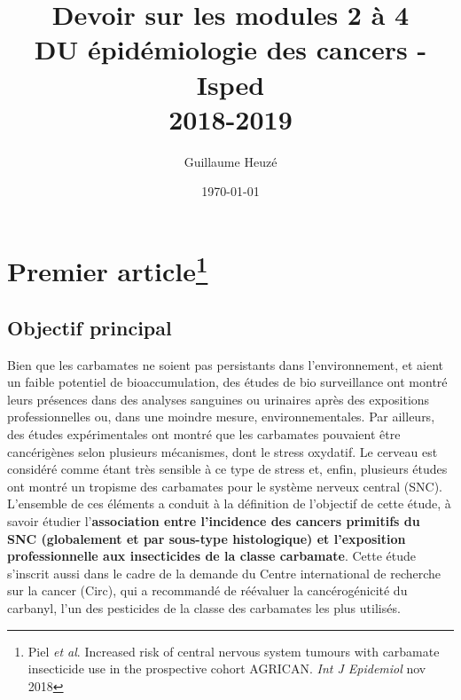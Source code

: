 \documentclass[10pt]{article}
\begin{document}
\title{Devoir sur les modules 2 à 4\\
\small{DU épidémiologie des cancers - Isped\\
2018-2019}}
\author{Guillaume Heuzé}
\date{\today}
\maketitle

\section{Premier article\protect\footnote{Piel \emph{et al}. Increased risk of central nervous system tumours with carbamate insecticide use in the prospective cohort AGRICAN. \emph{Int J Epidemiol} nov 2018}}

\subsection{Objectif principal}
Bien que les carbamates ne soient pas persistants dans l'environnement, et aient un faible potentiel de bioaccumulation, des études de bio surveillance ont montré leurs présences dans des analyses sanguines ou urinaires après des expositions professionnelles ou, dans une moindre mesure, environnementales. Par ailleurs, des études expérimentales ont montré que les carbamates pouvaient être cancérigènes selon plusieurs mécanismes, dont le stress oxydatif. Le cerveau est considéré comme étant très sensible à ce type de stress et, enfin, plusieurs études ont montré un tropisme des carbamates pour le système nerveux central (SNC). L'ensemble de ces éléments a conduit à la définition de l'objectif de cette étude, à savoir étudier l'\textbf{association entre l'incidence des cancers primitifs du SNC (globalement et par sous-type histologique) et l'exposition professionnelle aux insecticides de la classe carbamate}. Cette étude s'inscrit aussi dans le cadre de la demande du Centre international de recherche sur la cancer (Circ), qui a recommandé de réévaluer la cancérogénicité du carbanyl, l'un des pesticides de la classe des carbamates les plus utilisés.
\end{document}
